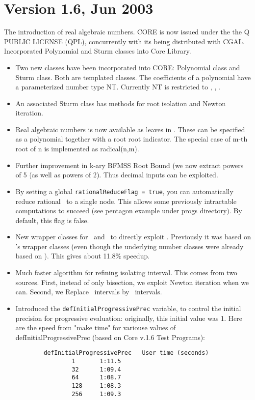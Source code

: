\documentclass[12pt]{article}
\begin{document}
\section{Version 1.6, Jun 2003}
The introduction of real algebraic numbers.
CORE is now issued under the the Q PUBLIC LICENSE (QPL),
concurrently with its being distributed with CGAL.
Incorporated Polynomial and Sturm classes into Core Library.

    \begin{itemize}
	\item Two new classes have been incorporated into CORE: 
		Polynomial class and Sturm class.  Both are templated classes.
		The coefficients of a polynomial
		have a parameterized number type NT.  Currently NT
		is restricted to \Int, \int, \lng.
	\item An associated Sturm class has methods for root isolation
		and Newton iteration.
        \item Real algebraic numbers is now available as leaves
		in \expr.  These can be specified as a polynomial
		together with a root root indicator.
	   	The special case of m-th root of n is implemented as 
		radical(n,m).
	\item Further improvement in k-ary BFMSS Root Bound (we now extract
		powers of 5 (as well as powers of 2).  Thus decimal inputs
		can be exploited.
	\item By setting a global \texttt{rationalReduceFlag = true},
		you can automatically
		reduce rational \expr\ to a single node.  This allows some
		previously intractable computations to succeed (see pentagon
		example under progs directory).  By default, this flag is false.
	\item New wrapper classes for \Int\ and \Rat\ to
		directly exploit \gmp.  Previously it was based on
		\lidia's wrapper classes (even though the
		underlying number classes were already based on \gmp).
		This gives about 11.8\% speedup.
	\item Much faster algorithm for refining isolating interval. 
		This comes from two sources. First,
		instead of only bisection, we exploit Newton iteration 
		when we can. Second, we
		Replace \expr\ intervals by \BF\ intervals.
	\item Introduced the \texttt{defInitialProgressivePrec} variable,
		to control the initial
		precision for progressive evaluation:
		originally, this initial value was 1.
		Here are the speed from "make time" for variouse values of 
		defInitialProgressivePrec (based on Core v.1.6 Test Programs):
\begin{verbatim}
		defInitialProgressivePrec 	User time (seconds)
				1		1:11.5
				32 		1:09.4
				64 		1:08.7
				128		1:08.3
				256		1:09.3
\end{verbatim}


\end{itemize}
\end{document}
